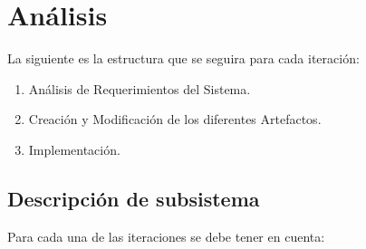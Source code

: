 \documentclass[]{article}
\begin{document}
		
		
		
		
		
		
		
		
		
		
		
		
		
		
		
		
		
		
		
		
		
		
		
		
		
		
		
	
\section{Análisis}
La siguiente es la estructura que se seguira para cada iteración:

\begin{enumerate}
	\item Análisis de Requerimientos del Sistema.
	\item Creación y Modificación de los diferentes Artefactos.
	\item Implementación.
\end{enumerate}

	\subsection{Descripción de subsistema}
	Para cada una de las iteraciones se debe tener en cuenta:
\end{document}
